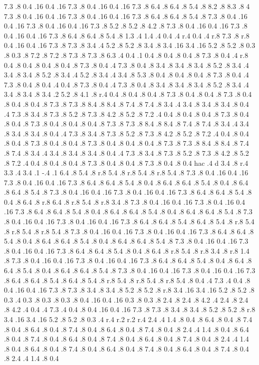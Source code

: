 7.3 .8 0.4 .16 0.4 .16 7.3 .8 0.4 .16 0.4 .16 7.3 .8 6.4 .8 6.4 .8 5.4 .8 8.2 .8 8.3 .8  4
7.3 .8 0.4 .16 0.4 .16 7.3 .8 0.4 .16 0.4 .16 7.3 .8 6.4 .8 6.4 .8 5.4 .8 7.3 .8 0.4 .16 0.4 .16 7.3 .8 0.4 .16 0.4 .16 7.3 .8 5.2 .8 5.2 .8 4.2 .8 7.3 .8 0.4 .16 0.4 .16 7.3 .8 0.4 .16 0.4 .16 7.3 .8 6.4 .8 6.4 .8 5.4 .8 1.3 .4 1.4 .4 0.4 .4 r.4 0.4 .4 r.8 7.3 .8 r.8 0.4 .16 0.4 .16 7.3 .8 7.3 .8 3.4 .4 5.2 .8 5.2 .8 3.4 .8 3.4 .16 3.4 .16 5.2 .8 5.2 .8 
0.3 .8 0.3 .8 7.2 .8 7.2 .8 7.3 .8 7.3 .8 6.3 .4 
0.4 .1 
0.4 .8 0.4 .8 0.4 .8 7.3 .8 0.4 .4 r.8 0.4 .8 0.4 .8 0.4 .8 0.4 .8 7.3 .8 0.4 .4 7.3 .8 0.4 .8 3.4 .8 3.4 .8 3.4 .8 5.2 .8 3.4 .4 3.4 .8 3.4 .8 5.2 .8 3.4 .4 5.2 .8 3.4 .4 3.4 .8 5.3 .8 0.4 .8 0.4 .8 0.4 .8 7.3 .8 0.4 .4 7.3 .8 0.4 .8 0.4 .4 0.4 .8 7.3 .8 0.4 .4 7.3 .8 0.4 .8 3.4 .8 3.4 .8 3.4 .8 5.2 .8 3.4 .4 3.4 .8 3.4 .8 3.4 .2 5.2 .8 4.1 .8 r.4 0.4 .8 0.4 .8 0.4 .8 7.3 .8 0.4 .8 0.4 .8 7.3 .8 0.4 .8 0.4 .8 0.4 .8 7.3 .8 7.3 .8 8.4 .8 8.4 .8 7.4 .8 7.4 .8 3.4 .4 3.4 .8 3.4 .8 3.4 .8 0.4 .4 7.3 .8 3.4 .8 7.3 .8 5.2 .8 7.3 .8 4.2 .8 5.2 .8 7.2 .4 0.4 .8 0.4 .8 0.4 .8 7.3 .8 0.4 .8 0.4 .8 7.3 .8 0.4 .8 0.4 .8 0.4 .8 7.3 .8 7.3 .8 8.4 .8 8.4 .8 7.4 .8 7.4 .8 3.4 .4 3.4 .8 3.4 .8 3.4 .8 0.4 .4 7.3 .8 3.4 .8 7.3 .8 5.2 .8 7.3 .8 4.2 .8 5.2 .8 7.2 .4 0.4 .8 0.4 .8 0.4 .8 7.3 .8 0.4 .8 0.4 .8 7.3 .8 0.4 .8 0.4 .8 0.4 .8 7.3 .8 7.3 .8 8.4 .8 8.4 .8 7.4 .8 7.4 .8 3.4 .4 3.4 .8 3.4 .8 3.4 .8 0.4 .4 7.3 .8 3.4 .8 7.3 .8 5.2 .8 7.3 .8 4.2 .8 5.2 .8 7.2 .4 0.4 .8 0.4 .8 0.4 .8 7.3 .8 0.4 .8 0.4 .8 7.3 .8 0.4 .8 0.4 {hac }.4 {d }3.4 .8 r.4 3.3 .4 3.4 .1 -.4 .1 6.4 .8 5.4 .8 r.8 5.4 .8 r.8 5.4 .8 r.8 5.4 .8 7.3 .8 0.4 .16 0.4 .16 7.3 .8 0.4 .16 0.4 .16 7.3 .8 6.4 .8 6.4 .8 5.4 .8 0.4 .8 6.4 .8 6.4 .8 5.4 .8 0.4 .8 6.4 .8 6.4 .8 5.4 .8 7.3 .8 0.4 .16 0.4 .16 7.3 .8 0.4 .16 0.4 .16 7.3 .8 6.4 .8 6.4 .8 5.4 .8 0.4 .8 6.4 .8 r.8 6.4 .8 r.8 5.4 .8 r.8 3.4 .8 7.3 .8 0.4 .16 0.4 .16 7.3 .8 0.4 .16 0.4 .16 7.3 .8 6.4 .8 6.4 .8 5.4 .8 0.4 .8 6.4 .8 6.4 .8 5.4 .8 0.4 .8 6.4 .8 6.4 .8 5.4 .8 7.3 .8 0.4 .16 0.4 .16 7.3 .8 0.4 .16 0.4 .16 7.3 .8 6.4 .8 6.4 .8 5.4 .8 6.4 .8 5.4 .8 r.8 5.4 .8 r.8 5.4 .8 r.8 5.4 .8 7.3 .8 0.4 .16 0.4 .16 7.3 .8 0.4 .16 0.4 .16 7.3 .8 6.4 .8 6.4 .8 5.4 .8 0.4 .8 6.4 .8 6.4 .8 5.4 .8 0.4 .8 6.4 .8 6.4 .8 5.4 .8 7.3 .8 0.4 .16 0.4 .16 7.3 .8 0.4 .16 0.4 .16 7.3 .8 6.4 .8 6.4 .8 5.4 .8 0.4 .8 6.4 .8 r.8 5.4 .8 r.8 3.4 .8 r.8 1.4 .8 7.3 .8 0.4 .16 0.4 .16 7.3 .8 0.4 .16 0.4 .16 7.3 .8 6.4 .8 6.4 .8 5.4 .8 0.4 .8 6.4 .8 6.4 .8 5.4 .8 0.4 .8 6.4 .8 6.4 .8 5.4 .8 7.3 .8 0.4 .16 0.4 .16 7.3 .8 0.4 .16 0.4 .16 7.3 .8 6.4 .8 6.4 .8 5.4 .8 6.4 .8 5.4 .8 r.8 5.4 .8 r.8 5.4 .8 r.8 5.4 .8 0.4 .4 7.3 .4 0.4 .8 0.4 .16 0.4 .16 7.3 .8 7.3 .8 3.4 .8 3.4 .8 5.2 .8 5.2 .8 r.8 3.4 .16 3.4 .16 5.2 .8 5.2 .8 0.3 .4 0.3 .8 0.3 .8 0.3 .8 0.4 .16 0.4 .16 0.3 .8 0.3 .8 2.4 .8 2.4 .8 4.2 .4 2.4 .8 2.4 .8 4.2 .4 0.4 .4 7.3 .4 0.4 .8 0.4 .16 0.4 .16 7.3 .8 7.3 .8 3.4 .8 3.4 .8 5.2 .8 5.2 .8 r.8 3.4 .16 3.4 .16 5.2 .8 5.2 .8 0.3 .4 r.4 r.2 r.2 r.4 2.4 .4 1.4 .8 0.4 .8 6.4 .8 0.4 .8 7.4 .8 0.4 .8 6.4 .8 0.4 .8 7.4 .8 0.4 .8 6.4 .8 0.4 .8 7.4 .8 0.4 .8 2.4 .4 1.4 .8 0.4 .8 6.4 .8 0.4 .8 7.4 .8 0.4 .8 6.4 .8 0.4 .8 7.4 .8 0.4 .8 6.4 .8 0.4 .8 7.4 .8 0.4 .8 2.4 .4 1.4 .8 0.4 .8 6.4 .8 0.4 .8 7.4 .8 0.4 .8 6.4 .8 0.4 .8 7.4 .8 0.4 .8 6.4 .8 0.4 .8 7.4 .8 0.4 .8 2.4 .4 1.4 .8 0.4 